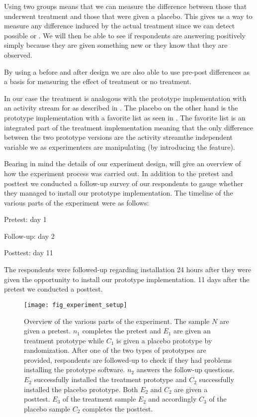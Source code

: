 Using two groups means that we can measure the difference between those that
underwent treatment and those that were given a placebo. This gives us a way
to measure any difference induced by the actual treatment since we can detect
possible  or .
We will then be able to see if respondents are answering positively simply
because they are given something new or they know that they are observed.

By using a before and after design we are also able to use pre-post
differences as a basis for measuring the effect of treatment or no
treatment.

In our case the treatment is analogous with the prototype implementation with
an activity stream for \urort{} as described in
.
The placebo on the other hand is the 
prototype implementation with a favorite list as seen in
.
The favorite list is an integrated part of the treatment implementation
meaning that the only difference between the two prototype versions are
the activity stream\dash{}the independent variable we as experimenters are
manipulating (by introducing the feature).

Bearing in mind the details of our experiment design,
 will give an overview of how the experiment
process was carried out. In addition to the pretest and posttest we
conducted a follow-up survey of our respondents to gauge whether they managed
to install our prototype implementation. The timeline of the various parts
of the experiment were as follows:

\begin{enum}
  \item Pretest: day 1
  \item Follow-up: day 2
  \item Posttest: day 11
\end{enum}

The respondents were followed-up regarding installation 24 hours after they
were given the opportunity to install our prototype implementation. 11 days
after the pretest we conducted a posttest.

\begin{figure}
  \texttt{[image: fig\_experiment\_setup]}
  \caption[Experiment Overview]{
    Overview of the various parts of the experiment. The sample $N$
    are given a pretest. $n_1$ completes the pretest and $E_1$ are given
    an treatment prototype while $C_1$ is given a placebo
    prototype by randomization.
    After one of the two types of prototypes are provided, respondents are
    followed-up to check if they had problems installing the prototype
    software. $n_2$ answers the follow-up questions.
    $E_2$ successfully installed the treatment prototype and $C_2$
    successfully installed the placebo prototype. Both $E_2$ and $C_2$ are
    given a posttest.
    $E_3$ of the treatment sample $E_2$ and accordingly $C_3$ of the
    placebo sample $C_2$ completes the posttest.
  }
  \label{figure:fig.experiment.setup}
\end{figure}

